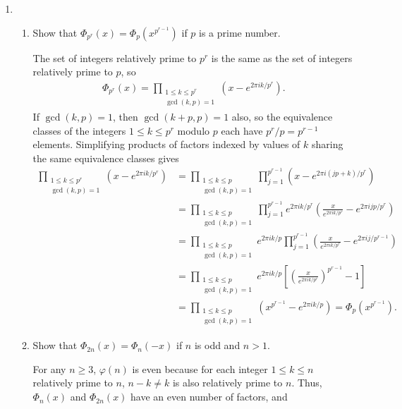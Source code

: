 \documentclass[12pt]{article}
\begin{document}
\begin{enumerate}
    \item 
    \begin{enumerate}
        \item Show that $\Phi_{p^r}(x) = \Phi_p(x^{p^{r-1}})$ if $p$ is a prime number. \par
            The set of integers relatively prime to $p^r$ is the same as the set of integers relatively prime to $p$, so
            \begin{align*}
                \Phi_{p^r}(x) = \prod_{\substack{1 \leq k \leq p^r \\ \gcd(k, p) = 1}} (x - e^{2\pi ik / p^r}).
            \end{align*}
            If $\gcd(k, p) = 1$, then $\gcd(k + p, p) = 1$ also, so the equivalence classes of the integers $1 \leq k \leq p^r$ modulo $p$ each have $p^r / p = p^{r - 1}$ elements. Simplifying products of factors indexed by values of $k$ sharing the same equivalence classes gives
            \begin{align*}
                \prod_{\substack{1 \leq k \leq p^r \\ \gcd(k, p) = 1}} (x - e^{2\pi ik / p^r})
                &= \prod_{\substack{1 \leq k \leq p \\ \gcd(k, p) = 1}} \prod_{j = 1}^{p^{r - 1}} (x - e^{2\pi i(jp + k) / p^r}) \\
                &= \prod_{\substack{1 \leq k \leq p \\ \gcd(k, p) = 1}} \prod_{j = 1}^{p^{r - 1}} e^{2\pi ik/p^r} \left( \frac{x}{e^{2\pi ik/p^r}} - e^{2\pi ijp / p^r} \right) \\
                &= \prod_{\substack{1 \leq k \leq p \\ \gcd(k, p) = 1}} e^{2\pi ik/p} \prod_{j = 1}^{p^{r - 1}} \left( \frac{x}{e^{2\pi ik/p^r}} - e^{2\pi ij / p^{r - 1}} \right) \\
                &= \prod_{\substack{1 \leq k \leq p \\ \gcd(k, p) = 1}} e^{2\pi ik/p} \left[ \left( \frac{x}{e^{2\pi ik/p^r}} \right)^{p^{r - 1}} - 1 \right] \\
                &= \prod_{\substack{1 \leq k \leq p \\ \gcd(k, p) = 1}} ( x^{p^{r - 1}} - e^{2\pi ik/p} )
                = \Phi_p(x^{p^{r - 1}}).
            \end{align*}
        \item Show that $\Phi_{2n}(x) = \Phi_n(-x)$ if $n$ is odd and $n > 1$. \par
            For any $n \geq 3$, $\varphi(n)$ is even because for each integer $1 \leq k \leq n$ relatively prime to $n$, $n - k \neq k$ is also relatively prime to $n$. Thus, $\Phi_n(x)$ and $\Phi_{2n}(x)$ have an even number of factors, and

\end{enumerate}
\end{enumerate}
\end{document}
